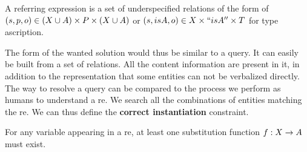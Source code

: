 \begin{definition}
A referring expression is a set of underspecified relations of the form of $(s, p, o) \in (X \cup A) \times P \times (X \cup A)$ or $(s, isA, o) \in X \times ``isA'' \times T$ for type ascription.
\end{definition}

The form of the wanted solution would thus be similar to a \sparql{} query. It can easily be built from a set of relations. All the content information are present in it, in addition to the representation that some entities can not be verbalized directly. The way to resolve a \sparql{} query can be compared to the process we perform as humans to understand a \acrshort{re}. We search all the combinations of entities matching the \acrshort{re}. We can thus define the \textbf{correct instantiation} constraint.

\begin{theorem} 
\label{the:correct_intance}
For any variable appearing in a \acrshort{re}, at least one substitution function $f: X \rightarrow A$ must exist.
\end{theorem}



